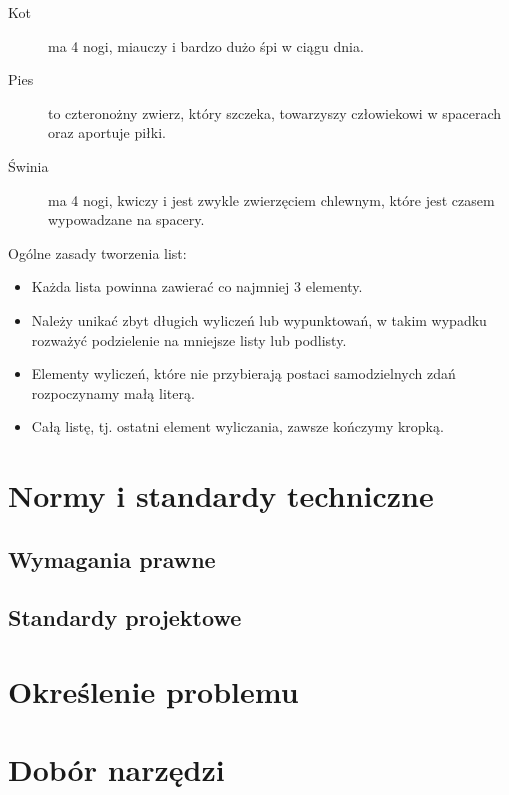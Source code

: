 \begin{description}
    \item[Kot] ma 4 nogi, miauczy i bardzo dużo śpi w ciągu dnia.
    \item[Pies] to czteronożny zwierz, który szczeka, towarzyszy człowiekowi w 
   spacerach oraz aportuje piłki.
    \item[Świnia] ma 4 nogi, kwiczy i jest zwykle zwierzęciem chlewnym, które jest 
   czasem wypowadzane na spacery.
\end{description}
\noindent Ogólne zasady tworzenia list:
\begin{itemize}
    \item Każda lista powinna zawierać co najmniej 3 elementy.
    \item Należy unikać zbyt długich wyliczeń lub wypunktowań, w takim wypadku rozważyć podzielenie 
    na mniejsze listy lub podlisty.
    \item Elementy wyliczeń, które nie przybierają postaci samodzielnych zdań rozpoczynamy małą literą.
    \item Całą listę, tj. ostatni element wyliczania, zawsze kończymy kropką.
\end{itemize}


\clearpage\section{Normy i standardy techniczne}
\noindent \lipsum[1-3]

    \subsection{Wymagania prawne}
    \noindent \lipsum[4-5]

    \subsection{Standardy projektowe}
    \noindent \lipsum[6-7]

\clearpage\section{Określenie problemu}
    \noindent \lipsum[8-9]

\clearpage\section{Dobór narzędzi}
    \noindent \lipsum[1-3]

